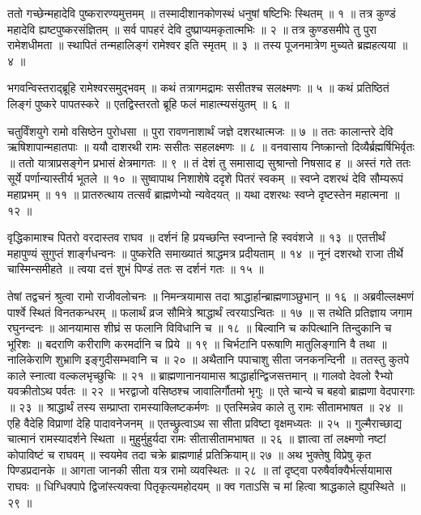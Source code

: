 
ततो गच्छेन्महादेवि पुष्करारण्यमुत्तमम् ॥
तस्मादीशानकोणस्थं धनुषां षष्टिभिः स्थितम् ॥ १ ॥
तत्र कुण्डं महादेवि ह्यष्टपुष्करसंज्ञितम् ॥
सर्व पापहरं देवि दुष्प्राप्यमकृतात्मभिः ॥ २ ॥
तत्र कुण्डसमीपे तु पुरा रामेशधीमता ॥
स्थापितं तन्महालिङ्गं रामेश्वर इति स्मृतम् ॥ ३ ॥
तस्य पूजनमात्रेण मुच्यते ब्रह्महत्यया ॥ ४ ॥

भगवन्विस्तराद्ब्रूहि रामेश्वरसमुद्भवम् ॥
कथं तत्रागमद्रामः ससीतश्च सलक्ष्मणः ॥ ५ ॥
कथं प्रतिष्ठितं लिङ्गं पुष्करे पापतस्करे ॥
एतद्विस्तरतो ब्रूहि फलं माहात्म्यसंयुतम् ॥ ६ ॥

चतुर्विंशयुगे रामो वसिष्ठेन पुरोधसा ॥
पुरा रावणनाशार्थं जज्ञे दशरथात्मजः ॥ ७ ॥
ततः कालान्तरे देवि ऋषिशापान्महातपाः ॥
ययौ दाशरथी रामः ससीतः सहलक्ष्मणः ॥ ८ ॥
वनवासाय निष्क्रान्तो दिव्यैर्ब्रह्मर्षिभिर्वृतः ॥
ततो यात्राप्रसङ्गेन प्रभासं क्षेत्रमागतः ॥ ९ ॥
तं देशं तु समासाद्य सुश्रान्तो निषसाद ह ॥
अस्तं गते ततः सूर्ये पर्णान्यास्तीर्य भूतले ॥ १० ॥
सुष्वापाथ निशाशेषे ददृशे पितरं स्वकम् ॥
स्वप्ने दशरथं देवि सौम्यरूपं महाप्रभम् ॥ ११ ॥
प्रातरुत्थाय तत्सर्वं ब्राह्मणेभ्यो न्यवेदयत् ॥
यथा दशरथः स्वप्ने दृष्टस्तेन महात्मना ॥ १२ ॥

वृद्धिकामाश्च पितरो वरदास्तव राघव ॥
दर्शनं हि प्रयच्छन्ति स्वप्नान्ते हि स्ववंशजे ॥ १३ ॥
एतत्तीर्थं महापुण्यं सुगुप्तं शार्ङ्गधन्वनः ॥
पुष्करेति समाख्यातं श्राद्धमत्र प्रदीयताम् ॥ १४ ॥
नूनं दशरथो राजा तीर्थे चास्मिन्समीहते ॥
त्वया दत्तं शुभं पिण्डं ततः स दर्शनं गतः ॥ १५ ॥

तेषां तद्वचनं श्रुत्वा रामो राजीवलोचनः ॥
निमन्त्रयामास तदा श्राद्धार्हान्ब्राह्मणाञ्छुभान् ॥ १६ ॥
अब्रवील्लक्ष्मणं पार्श्वे स्थितं विनतकन्धरम् ॥
फलार्थं व्रज सौमित्रे श्राद्धार्थं त्वरयाऽन्वितः ॥ १७ ॥
स तथेति प्रतिज्ञाय जगाम रघुनन्दनः ॥
आनयामास शीघ्रं स फलानि विविधानि च ॥ १८ ॥
बिल्वानि च कपित्थानि तिन्दुकानि च भूरिशः ॥
बदराणि करीराणि करमर्दानि च प्रिये ॥ १९ ॥
चिर्भटानि परूषाणि मातुलिङ्गानि वै तथा ॥
नालिकेराणि शुभ्राणि इङ्गुदीसम्भवानि च ॥ २० ॥
अथैतानि पपाचाशु सीता जनकनन्दिनी ॥
ततस्तु कुतपे काले स्नात्वा वल्कलभृच्छुचिः ॥ २१ ॥
ब्राह्मणानानयामास श्राद्धार्हान्द्विजसत्तमान् ॥
गालवो देवलो रैभ्यो यवक्रीतोऽथ पर्वतः ॥ २२ ॥
भरद्वाजो वसिष्ठश्च जावालिर्गौतमो भृगुः ॥
एते चान्ये च बहवो ब्राह्मणा वेदपारगाः ॥ २३ ॥
श्राद्धार्थं तस्य सम्प्राप्ता रामस्याक्लिष्टकर्मणः ॥
एतस्मिन्नेव काले तु रामः सीतामभाषत ॥ २४ ॥
एहि वैदेहि विप्राणां देहि पादावनेजनम् ॥
एतच्छ्रुत्वाऽथ सा सीता प्रविष्टा वृक्षमध्यतः ॥ २५ ॥
गुल्मैराच्छाद्य चात्मानं रामस्यादर्शने स्थिता ॥
मुहुर्मुहुर्यदा रामः सीतासीतामभाषत ॥ २६ ॥
ज्ञात्वा तां लक्ष्मणो नष्टां कोपाविष्टं च राघवम् ॥
स्वयमेव तदा चक्रे ब्राह्मणार्ह प्रतिक्रियाम्॥ २७ ॥
अथ भुक्तेषु विप्रेषु कृत पिण्डप्रदानके ॥
आगता जानकी सीता यत्र रामो व्यवस्थितः ॥ २८ ॥
तां दृष्ट्वा परुषैर्वाक्यैर्भर्त्सयामास राघवः ॥
धिग्धिक्पापे द्विजांस्त्यक्त्वा पितृकृत्यमहोदयम् ॥
क्व गताऽसि च मां हित्वा श्राद्धकाले ह्युपस्थिते ॥ २९ ॥

